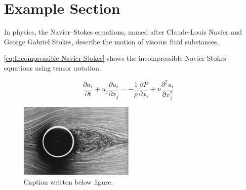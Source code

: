 \section{Example Section}

In physics, the Navier–Stokes equations, named after Claude-Louis Navier and George Gabriel Stokes, describe the motion of viscous fluid substances.

\eqref{eq:Incompressible Navier-Stokes} shows the incompressible Navier-Stokes equations using tensor notation.

\begin{equation}
    \frac{\partial u_i}{\partial t} + u_j \frac{\partial u_i}{\partial x_j} = -\frac{1}{\rho} \frac{\partial P}{\partial x_i} + \nu \frac{\partial^2 u_i}{\partial x_j^2}
    \label{eq:Incompressible Navier-Stokes}
\end{equation}

\begin{figure}[H]
    \centering
    \includegraphics[width=0.5\textwidth]{images/CylinderImage.jpg}
    \caption[Caption used in list of tables]{Caption written below figure.}
    \label{fig:flow around cylinder}
\end{figure}

